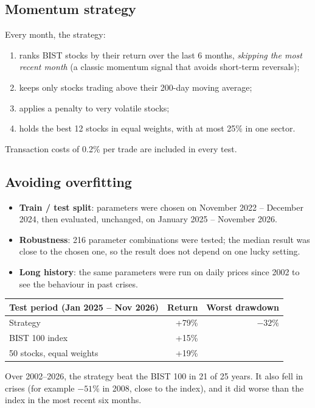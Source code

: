 \documentclass[a4paper,11pt]{article}
\begin{document}
\subsection*{Momentum strategy}
Every month, the strategy:
\begin{enumerate}
  \item ranks BIST stocks by their return over the last 6 months, \emph{skipping the most recent month} (a classic momentum signal that avoids short-term reversals);
  \item keeps only stocks trading above their 200-day moving average;
  \item applies a penalty to very volatile stocks;
  \item holds the best 12 stocks in equal weights, with at most 25\% in one sector.
\end{enumerate}
Transaction costs of 0.2\% per trade are included in every test.

\subsection*{Avoiding overfitting}
\begin{itemize}
  \item \textbf{Train / test split}: parameters were chosen on November 2022 -- December 2024, then evaluated, unchanged, on January 2025 -- November 2026.
  \item \textbf{Robustness}: 216 parameter combinations were tested; the median result was close to the chosen one, so the result does not depend on one lucky setting.
  \item \textbf{Long history}: the same parameters were run on daily prices since 2002 to see the behaviour in past crises.
\end{itemize}

\begin{center}
\begin{tabular}{@{}lrr@{}}
\toprule
\textbf{Test period (Jan 2025 -- Nov 2026)} & \textbf{Return} & \textbf{Worst drawdown} \\
\midrule
Strategy & +79\% & $-32\%$ \\
BIST 100 index & +15\% & \\
50 stocks, equal weights & +19\% & \\
\bottomrule
\end{tabular}
\end{center}

Over 2002--2026, the strategy beat the BIST 100 in 21 of 25 years. It also fell in crises (for example $-51\%$ in 2008, close to the index), and it did worse than the index in the most recent six months.
\end{document}
